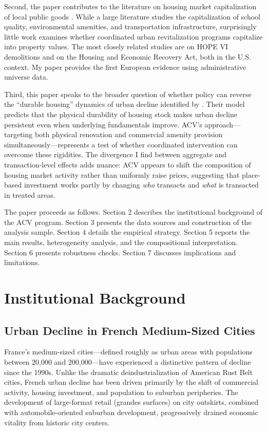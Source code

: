 \documentclass[12pt]{article}
\begin{document}
Second, the paper contributes to the literature on housing market capitalization of local public goods \citep{rosen1974hedonic}. While a large literature studies the capitalization of school quality, environmental amenities, and transportation infrastructure, surprisingly little work examines whether coordinated urban revitalization programs capitalize into property values. The most closely related studies are \citet{helms2003effect} on HOPE VI demolitions and \citet{diamond2019housing} on the Housing and Economic Recovery Act, both in the U.S. context. My paper provides the first European evidence using administrative universe data.

Third, this paper speaks to the broader question of whether policy can reverse the ``durable housing'' dynamics of urban decline identified by \citet{glaeser2005urban}. Their model predicts that the physical durability of housing stock makes urban decline persistent even when underlying fundamentals improve. ACV's approach---targeting both physical renovation and commercial amenity provision simultaneously---represents a test of whether coordinated intervention can overcome these rigidities. The divergence I find between aggregate and transaction-level effects adds nuance: ACV appears to shift the composition of housing market activity rather than uniformly raise prices, suggesting that place-based investment works partly by changing \textit{who} transacts and \textit{what} is transacted in treated areas.

The paper proceeds as follows. Section 2 describes the institutional background of the ACV program. Section 3 presents the data sources and construction of the analysis sample. Section 4 details the empirical strategy. Section 5 reports the main results, heterogeneity analysis, and the compositional interpretation. Section 6 presents robustness checks. Section 7 discusses implications and limitations.


\section{Institutional Background}

\subsection{Urban Decline in French Medium-Sized Cities}

France's medium-sized cities---defined roughly as urban areas with populations between 20,000 and 200,000---have experienced a distinctive pattern of decline since the 1990s. Unlike the dramatic deindustrialization of American Rust Belt cities, French urban decline has been driven primarily by the shift of commercial activity, housing investment, and population to suburban peripheries. The development of large-format retail (grandes surfaces) on city outskirts, combined with automobile-oriented suburban development, progressively drained economic vitality from historic city centers.
\end{document}
